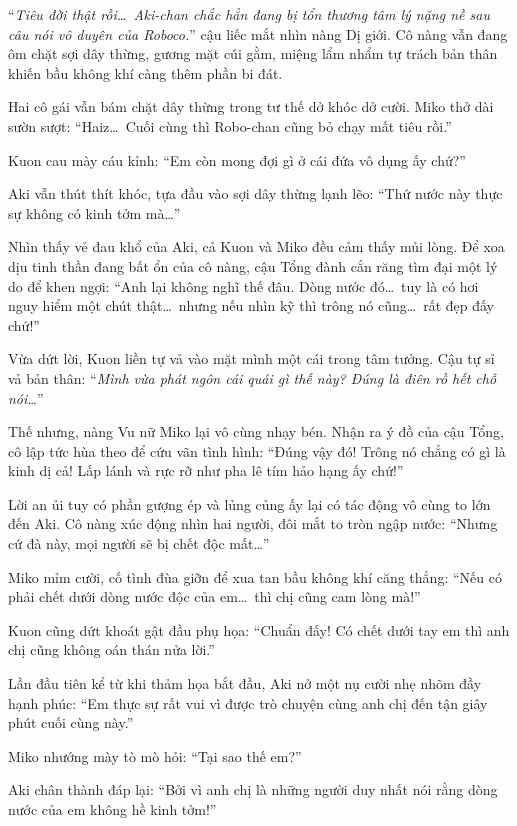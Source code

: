 \documentclass[../main.tex]{subfiles}
\begin{document}
``\textit{Tiêu đời thật rồi\dots\ Aki-chan chắc hẳn đang bị tổn thương tâm lý nặng nề sau câu nói vô duyên của Roboco.}'' cậu liếc mắt nhìn nàng Dị giới. Cô nàng vẫn đang ôm chặt sợi dây thừng, gương mặt cúi gằm, miệng lẩm nhẩm tự trách bản thân khiến bầu không khí càng thêm phần bi đát.

Hai cô gái vẫn bám chặt dây thừng trong tư thế dở khóc dở cười. Miko thở dài sườn sượt: ``Haiz\dots\ Cuối cùng thì Robo-chan cũng bỏ chạy mất tiêu rồi.''

Kuon cau mày cáu kỉnh:
``Em còn mong đợi gì ở cái đứa vô dụng ấy chứ?''

Aki vẫn thút thít khóc, tựa đầu vào sợi dây thừng lạnh lẽo:
``Thứ nước này thực sự không có kinh tởm mà\dots''

Nhìn thấy vẻ đau khổ của Aki, cả Kuon và Miko đều cảm thấy mủi lòng. Để xoa dịu tinh thần đang bất ổn của cô nàng, cậu Tổng đành cắn răng tìm đại một lý do để khen ngợi: ``Anh lại không nghĩ thế đâu. Dòng nước đó\dots\ tuy là có hơi nguy hiểm một chút thật\dots\ nhưng nếu nhìn kỹ thì trông nó cũng\dots\ rất đẹp đấy chứ!''

Vừa dứt lời, Kuon liền tự vả vào mặt mình một cái trong tâm tưởng. Cậu tự sỉ vả bản thân: ``\textit{Mình vừa phát ngôn cái quái gì thế này? Đúng là điên rồ hết chỗ nói\dots}''

Thế nhưng, nàng Vu nữ Miko lại vô cùng nhạy bén. Nhận ra ý đồ của cậu Tổng, cô lập tức hùa theo để cứu vãn tình hình:
``Đúng vậy đó! Trông nó chẳng có gì là kinh dị cả! Lấp lánh và rực rỡ như pha lê tím hảo hạng ấy chứ!''

Lời an ủi tuy có phần gượng ép và lủng củng ấy lại có tác động vô cùng to lớn đến Aki. Cô nàng xúc động nhìn hai người, đôi mắt to tròn ngập nước:
``Nhưng cứ đà này, mọi người sẽ bị chết độc mất\dots''

Miko mỉm cười, cố tình đùa giỡn để xua tan bầu không khí căng thẳng:
``Nếu có phải chết dưới dòng nước độc của em\dots\ thì chị cũng cam lòng mà!''

Kuon cũng dứt khoát gật đầu phụ họa:
``Chuẩn đấy! Có chết dưới tay em thì anh chị cũng không oán thán nửa lời.''

Lần đầu tiên kể từ khi thảm họa bắt đầu, Aki nở một nụ cười nhẹ nhõm đầy hạnh phúc:
``Em thực sự rất vui vì được trò chuyện cùng anh chị đến tận giây phút cuối cùng này.''

Miko nhướng mày tò mò hỏi:
``Tại sao thế em?''

Aki chân thành đáp lại:
``Bởi vì anh chị là những người duy nhất nói rằng dòng nước của em không hề kinh tởm!''
\end{document}
